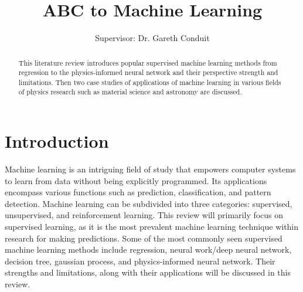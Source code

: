 \documentclass[aps,prb,twocolumn,superscriptaddress,floatfix]{revtex4-2}
\newcommand{\mytitle}{ABC to Machine Learning}
\begin{document}
\title{\mytitle}

\author{Supervisor: Dr. Gareth Conduit}

\newpage

\begin{abstract}

\noindent
This literature review introduces popular supervised machine learning methods from regression to the physics-informed neural network and their perspective strength and limitations. Then two case studies of applications of machine learning in various fields of physics research such as material science and astronomy are discussed. 
\end{abstract}

\maketitle

\section{Introduction}
Machine learning is an intriguing field of study that empowers computer systems to learn from data without being explicitly programmed. Its applications encompass various functions such as prediction, classification, and pattern detection\cite{towardsdatascienceMachineLearning}. Machine learning can be subdivided into three categories: supervised, unsupervised, and reinforcement learning. This review will primarily focus on supervised learning, as it is the most prevalent machine learning technique within research for making predictions. Some of the most commonly seen supervised machine learning methods include regression, neural work/deep neural network, decision tree, gaussian process, and physics-informed neural network. Their strengths and limitations, along with their applications will be discussed in this review.
\end{document}
